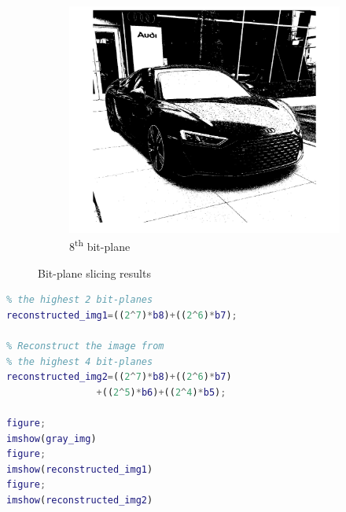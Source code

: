 \documentclass[conference]{IEEEtran}
\begin{document}
\begin{figure}[h!]
\begin{subfigure}[b]{0.3\linewidth}
\includegraphics[width=\linewidth]{images/img11.jpg}
\caption{8\textsuperscript{th} bit-plane}
\end{subfigure}
\caption{Bit-plane slicing results}
\label{fig:bit-plane slicing results}
\end{figure}

\begin{lstlisting}[language=Matlab]
% Reconstruct the image from 
% the highest 2 bit-planes 
reconstructed_img1=((2^7)*b8)+((2^6)*b7);

% Reconstruct the image from 
% the highest 4 bit-planes
reconstructed_img2=((2^7)*b8)+((2^6)*b7) 
                +((2^5)*b6)+((2^4)*b5);

figure;
imshow(gray_img)
figure;
imshow(reconstructed_img1)
figure;
imshow(reconstructed_img2)

\end{lstlisting}
\end{document}
